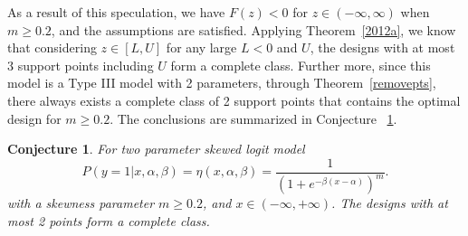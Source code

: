 \documentclass[12pt]{amsart}
\newtheorem{conjecture}[theorem]{Conjecture}
\theoremstyle{definition}
\theoremstyle{remark}
\numberwithin{equation}{section}
\begin{document}
As a result of this speculation, we have $F(z)<0$ for $z\in (-\infty,\infty)$ when $m\ge 0.2$, and the assumptions are satisfied. Applying Theorem~\ref{2012a}, we know that considering $z\in[L,U]$ for any large $L<0$ and $U$, the designs with at most 3 support points including $U$ form a complete class. Further more, since this model is a Type III model with 2 parameters, through Theorem~\ref{removepts}, there always exists a complete class of 2 support points that contains the optimal design for $m\ge0.2$. The conclusions are summarized in Conjecture~
\ref{skew}.

     

\begin{conjecture}\label{skew}
For two parameter skewed logit model\[
P(y=1|x,\alpha,\beta) = \eta(x,\alpha,\beta)= \frac{1}{(1+e^{-\beta(x-\alpha)})^m}.
\]with a skewness parameter $m\ge0.2$, and $x\in (-\infty,+\infty)$. The designs with at most 2 points form a complete class.
\end{conjecture}
\end{document}
